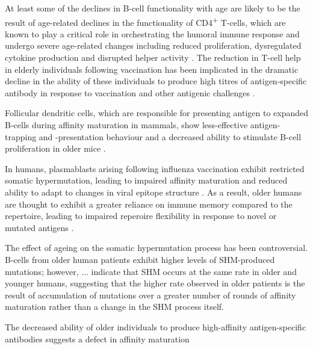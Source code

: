 At least some of the declines in B-cell functionality with age are likely to be the result of age-related declines in the functionality of CD4\textsuperscript{+} T-cells, which are known to play a critical role in orchestrating the humoral immune response \parencite{montecino2013immunosenescence} and undergo severe age-related changes including reduced proliferation, dysregulated cytokine production and disrupted helper activity \parencite{aberle2013mechanistic}. The reduction in T-cell help in elderly individuals following vaccination 
has been implicated in the dramatic decline in the ability of these individuals to produce high titres of antigen-specific antibody in response to vaccination and other antigenic challenges \parencite{aberle2013mechanistic}.

Follicular dendritic cells, which are responsible for presenting antigen to expanded B-cells during affinity maturation in mammals, show less-effective antigen-trapping and -presentation behaviour and a decreased ability to stimulate B-cell proliferation in older mice \parencite{ademokun2010ageing}.

In humans, plasmablasts arising following influenza vaccination exhibit restricted somatic hypermutation, leading to impaired affinity maturation and reduced ability to adapt to changes in viral epitope structure \parencite{henry2019influenza}.
As a result, older humans are thought to exhibit a greater reliance on immune memory compared to the \naive repertoire, leading to impaired reperoire flexibility in response to novel or mutated antigens \parencite{henry2019influenza}. %

The effect of ageing on the somatic hypermutation process has been controversial. B-cells from older human patients exhibit higher levels of SHM-produced mutations; however, ... indicate that SHM occurs at the same rate in older and younger humans, suggesting that the higher rate observed in older patients is the result of accumulation of mutations over a greater number of rounds of affinity maturation rather than a change in the SHM process itself. 

The decreased ability of older individuals to produce high-affinity antigen-specific antibodies \parencite{frasca2011age} suggests a defect in affinity maturation

